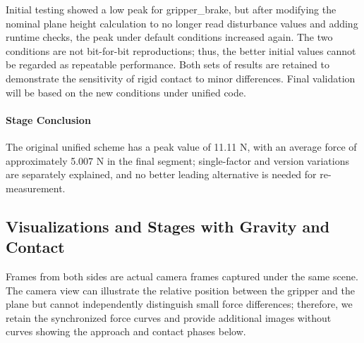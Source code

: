 Initial testing showed a low peak for gripper\_brake, but after modifying the nominal plane height calculation to no longer read disturbance values and adding runtime checks, the peak under default conditions increased again. The two conditions are not bit-for-bit reproductions; thus, the better initial values cannot be regarded as repeatable performance. Both sets of results are retained to demonstrate the sensitivity of rigid contact to minor differences. Final validation will be based on the new conditions under unified code.




\paragraph{Stage Conclusion} The original unified scheme has a peak value of 11.11 N, with an average force of approximately 5.007 N in the final segment; single-factor and version variations are separately explained, and no better leading alternative is needed for re-measurement.



\subsection{Visualizations and Stages with Gravity and Contact}
Frames from both sides are actual camera frames captured under the same scene. The camera view can illustrate the relative position between the gripper and the plane but cannot independently distinguish small force differences; therefore, we retain the synchronized force curves and provide additional images without curves showing the approach and contact phases below.



